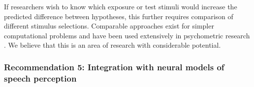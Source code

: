 \documentclass[
  11pt,
  man,floatsintext]{apa6}
\begin{document}
If researchers wish to know which exposure or test stimuli would increase the predicted difference between hypotheses, this further requires comparison of different stimulus selections. Comparable approaches exist for simpler computational problems and have been used extensively in psychometric research \autocites[incl.~online stimulus selection during the experiment, depending on subject-specific performance, e.g.,][]{vul2011,prins2013}. We believe that this is an area of research with considerable potential.

\hypertarget{recommendation-5-integration-with-neural-models-of-speech-perception}{%
\subsubsection{Recommendation 5: Integration with neural models of speech perception}\label{recommendation-5-integration-with-neural-models-of-speech-perception}}
\end{document}
